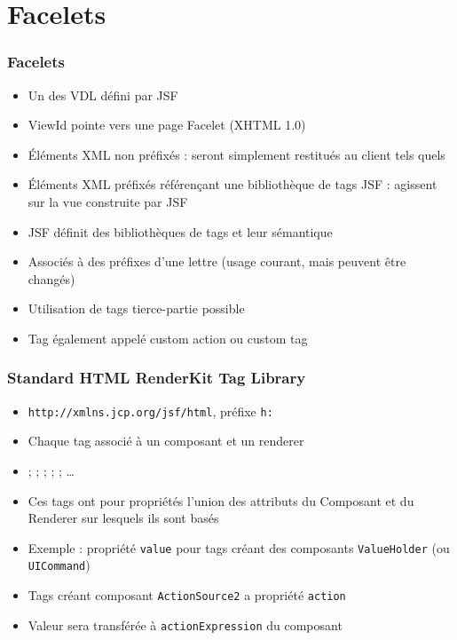 \documentclass[english, french]{beamer}
\begin{document}
\section{Facelets}
\begin{frame}
	\frametitle{Facelets}
	\begin{itemize}
		\item Un des VDL défini par JSF
		\item ViewId pointe vers une page Facelet (XHTML 1.0)
		\item Éléments XML non préfixés : seront simplement restitués au client tels quels
		\item Éléments XML préfixés référençant une bibliothèque de tags JSF : agissent sur la vue construite par JSF
		\item JSF définit des bibliothèques de tags et leur sémantique
		\item Associés à des préfixes d’une lettre {\tiny (usage courant, mais peuvent être changés)}
		\item Utilisation de tags tierce-partie possible
		\item \tiny Tag également appelé custom action ou custom tag
	\end{itemize}
\end{frame}

\begin{frame}
	\frametitle{Standard HTML RenderKit Tag Library}
	\begin{itemize}
		\item \texttt{http://xmlns.jcp.org/jsf/html}, préfixe \texttt{h:}
		\item Chaque tag associé à un composant et un renderer  %
		\item {} ;  ;  ;  ;  ; …
		\item Ces tags ont pour propriétés l’union des attributs du Composant et du Renderer sur lesquels ils sont basés
		\item Exemple : propriété \texttt{value} pour tags créant des composants \texttt{ValueHolder} (ou \texttt{UICommand})
		\item Tags créant composant \texttt{ActionSource2} a propriété \texttt{action}
		\item Valeur sera transférée à \texttt{actionExpression} du composant
	\end{itemize}
\end{frame}
\end{document}
